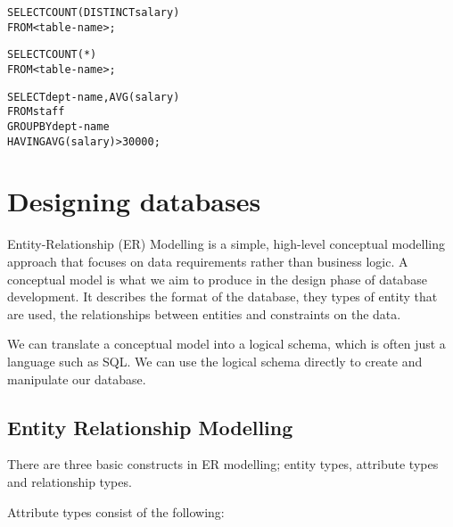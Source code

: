 \begin{mymulticols}
  \begin{alltt}
  	SELECT COUNT(DISTINCT salary)\\
  	FROM <table-name>;	
  \end{alltt}

  \begin{alltt}
    SELECT COUNT(*)\\
    FROM <table-name>;
  \end{alltt}

  \begin{alltt}
    SELECT dept-name, AVG(salary)\\
    FROM staff\\
    GROUP BY dept-name\\
    HAVING AVG(salary) > 30000;
  \end{alltt}

\end{mymulticols}

\section{Designing databases}

Entity-Relationship (ER) Modelling is a simple, high-level conceptual modelling
approach that focuses on data requirements rather than business logic. A
conceptual model is what we aim to produce in the design phase of database
development. It describes the format of the database, they types of entity that
are used, the relationships between entities and constraints on the data.

We can translate a conceptual model into a logical schema, which is often just a
language such as SQL. We can use the logical schema directly to create and
manipulate our database.

\subsection{Entity Relationship Modelling}

There are three basic constructs in ER modelling; entity types, attribute types
and relationship types.

Attribute types consist of the following:


